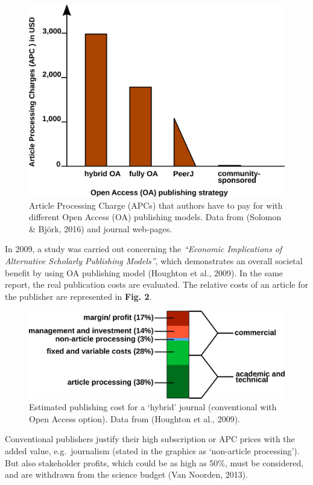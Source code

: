 \documentclass[10pt,fleqn]{wlpeerj}
\begin{document}
\begin{figure}[htbp]
\centering
\includegraphics{fig-OA-strategies-APCs_small.png}
\caption{Article Processing Charge (APCs) that authors have to pay for
with different Open Access (OA) publishing models. Data from (Solomon \&
Björk, 2016) and journal web-pages.}
\end{figure}

In 2009, a study was carried out concerning the \emph{``Economic
Implications of Alternative Scholarly Publishing Models''}, which
demonstrates an overall societal benefit by using OA publishing model
(Houghton et al., 2009). In the same report, the real publication costs
are evaluated. The relative costs of an article for the publisher are
represented in \textbf{Fig. 2}.

\begin{figure}[htbp]
\centering
\includegraphics{fig-hybrid-publishing-costs_small.png}
\caption{Estimated publishing cost for a `hybrid' journal (conventional
with Open Access option). Data from (Houghton et al., 2009).}
\end{figure}

Conventional publishers justify their high subscription or APC prices
with the added value, e.g.~journalism (stated in the graphics as
`non-article processing'). But also stakeholder profits, which could be
as high as 50\%, must be considered, and are withdrawn from the science
budget (Van Noorden, 2013).
\end{document}
